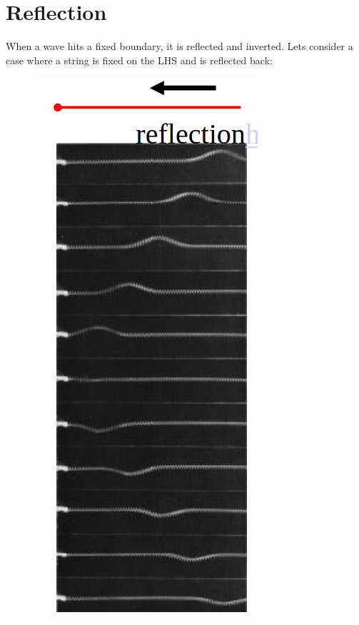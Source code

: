 \section*{Reflection}
When a wave hits a fixed boundary, it is reflected and inverted. Lets consider a case where a string is fixed on the LHS and is reflected back:
\begin{figure}[H]
    \centering
    \includegraphics{figures/lec04-02.png}
\end{figure}

